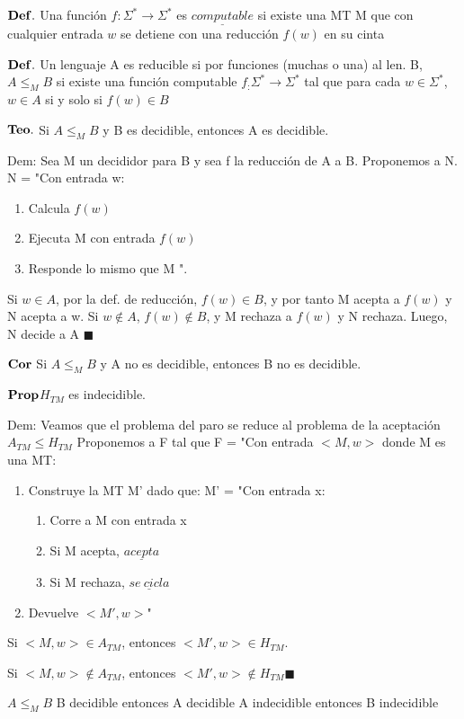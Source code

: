\documentclass{homework}
\begin{document}
$\bf{Def.}$ Una función $f: \Sigma^{*} \rightarrow \Sigma^{*}$ es $\underline{computable}$ si existe una MT M que con cualquier entrada $w$ se detiene con una reducción $f(w)$ en su cinta

$\bf{Def.}$ Un lenguaje A es reducible si por funciones (muchas o una) al len. B, $A \leq_{M} B$ si existe una función computable $f_ : \Sigma^{*} \rightarrow \Sigma^{*}$ tal que para cada $w \in \Sigma^{*}$, $w \in A$ si y solo si $f(w) \in B$

$\bf{Teo.}$ Si $A \leq_{M} B$ y B es decidible, entonces A es decidible.

Dem: Sea M un decididor para B y sea f la reducción de A a B. Proponemos a N.
N = "Con entrada w:
\begin{enumerate}
	\item Calcula $f(w)$
	\item Ejecuta M con entrada $f(w)$
	\item Responde lo mismo que M ".
\end{enumerate}

Si $w \in A$, por la def. de reducción, $f(w) \in B$, y por tanto M acepta a $f(w)$ y N acepta a w. Si $w \notin A$, $f(w) \notin B$, y M rechaza a $f(w)$ y N rechaza.
Luego, N decide a A $\blacksquare$

$\bf{Cor}$ Si $A \leq_{M} B$ y A no es decidible, entonces B no es decidible.

$\bf{Prop} $$H_{TM}$ es indecidible.

Dem: Veamos que el problema del paro se reduce al problema de la aceptación $A_{TM} \leq H_{TM}$ 
Proponemos a F tal que
F = "Con entrada $<M,w>$ donde M es una MT:
\begin{enumerate}
	\item Construye la MT M' dado que:
	M' = "Con entrada x:
	\begin{enumerate}
		\item Corre a M con entrada x
		\item Si M acepta, $\underline{acepta}$
		\item Si M rechaza, $\underline{se\ cicla}$
	\end{enumerate}
	\item Devuelve $<M',w>$"
\end{enumerate}

Si $<M, w> \in A_{TM}$, entonces $<M',w> \in H_{TM}$.

Si $<M, w> \notin A_{TM}$, entonces $<M',w> \notin H_{TM} \blacksquare$  

$A \leq_M B$
B decidible entonces A decidible
A indecidible entonces B indecidible
\end{document}
